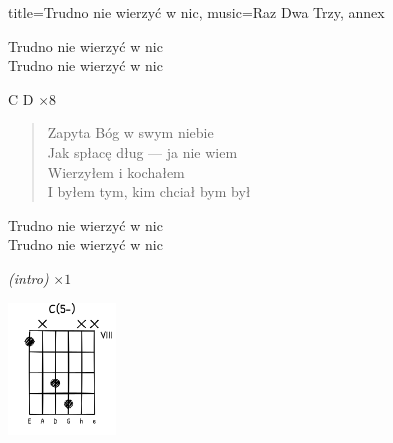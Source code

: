 \begin{song}{title={Trudno nie wierzyć w nic}, music={Raz Dwa Trzy}, annex}
\begin{multicols}{2}
\begin{chorus}
        Trudno nie wierzyć w nic \\
        Trudno nie wierzyć w nic
    \end{chorus}
    \begin{solo}
        C D $\times 8$
    \end{solo}
    \begin{verse}
        Zapyta Bóg w swym niebie \\
        Jak spłacę dług --- ja nie wiem \\
        Wierzyłem i kochałem \\
        I byłem tym, kim chciał bym był
    \end{verse}
    \begin{chorus}
        Trudno nie wierzyć w nic \\
        Trudno nie wierzyć w nic
    \end{chorus}
    \begin{outro}
        \textit{(intro)} $\times 1$
    \end{outro}
    \vfill\null\columnbreak{}
    \begin{center}
        \includegraphics[height=3.5cm]{images/C5dim.png}
    \end{center}
    \end{multicols}
\end{song}

